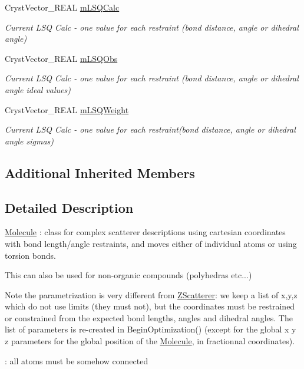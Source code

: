 \begin{DoxyCompactItemize}
Cryst\+Vector\+\_\+\+R\+E\+AL \mbox{\hyperlink{class_obj_cryst_1_1_molecule_a9e9be5fe3d3037cdf690df16235e370d}{m\+L\+S\+Q\+Calc}}
\begin{DoxyCompactList}\small\item\em Current L\+SQ Calc -\/ one value for each restraint (bond distance, angle or dihedral angle) \end{DoxyCompactList}\item 
\mbox{\label{class_obj_cryst_1_1_molecule_a6202acc4d02c90999f008c089bf1b21e}} 
Cryst\+Vector\+\_\+\+R\+E\+AL \mbox{\hyperlink{class_obj_cryst_1_1_molecule_a6202acc4d02c90999f008c089bf1b21e}{m\+L\+S\+Q\+Obs}}
\begin{DoxyCompactList}\small\item\em Current L\+SQ Calc -\/ one value for each restraint (bond distance, angle or dihedral angle ideal values) \end{DoxyCompactList}\item 
\mbox{\label{class_obj_cryst_1_1_molecule_a7305a71a61c7ceedaf09b28a0d1ed64d}} 
Cryst\+Vector\+\_\+\+R\+E\+AL \mbox{\hyperlink{class_obj_cryst_1_1_molecule_a7305a71a61c7ceedaf09b28a0d1ed64d}{m\+L\+S\+Q\+Weight}}
\begin{DoxyCompactList}\small\item\em Current L\+SQ Calc -\/ one value for each restraint(bond distance, angle or dihedral angle sigmas) \end{DoxyCompactList}\end{DoxyCompactItemize}
\subsection*{Additional Inherited Members}


\subsection{Detailed Description}
\mbox{\hyperlink{class_obj_cryst_1_1_molecule}{Molecule}} \+: class for complex scatterer descriptions using cartesian coordinates with bond length/angle restraints, and moves either of individual atoms or using torsion bonds.

This can also be used for non-\/organic compounds (polyhedras etc...) \begin{DoxyNote}{Note}
the parametrization is very different from \mbox{\hyperlink{class_obj_cryst_1_1_z_scatterer}{Z\+Scatterer}}\+: we keep a list of x,y,z which do not use limits (they must not), but the coordinates must be restrained or constrained from the expected bond lengths, angles and dihedral angles. The list of parameters is re-\/created in Begin\+Optimization() (except for the global x y z parameters for the global position of the \mbox{\hyperlink{class_obj_cryst_1_1_molecule}{Molecule}}, in fractionnal coordinates).

\+: all atoms must be somehow connected 
\end{DoxyNote}



